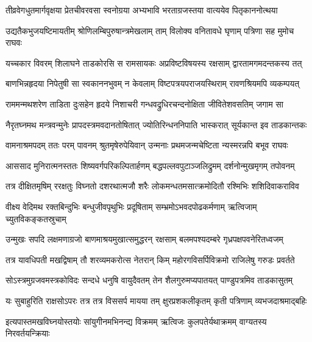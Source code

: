 \fourlineindentedshloka
{तीव्रवेगधुतमार्गवृक्षया}
{प्रेतचीवरवसा स्वनोग्रया}
{अभ्यभावि भरताग्रजस्तया}
{वात्ययेव पितृकाननोत्थया} %

\fourlineindentedshloka
{उद्यतैकभुजयष्टिमायतीम्}
{श्रोणिलम्बिपुरुषान्त्रमेखलाम्}
{ताम् विलोक्य वनितावधे घृणाम्}
{पत्रिणा सह मुमोच राघवः} %

\fourlineindentedshloka
{यच्चकार विवरम् शिलाघने}
{ताडकोरसि स रामसायकः}
{अप्रविष्टविषयस्य रक्षसाम्}
{द्वारतामगमदन्तकस्य तत्} %

\fourlineindentedshloka
{बाणभिन्नहृदया निपेतुषी}
{सा स्वकाननभुवम् न केवलाम्}
{विष्टपत्रयपराजयस्थिराम्}
{रावणश्रियमपि व्यकम्पयत्} %

\fourlineindentedshloka
{राममन्मथशरेण ताडिता}
{दुःसहेन हृदये निशाचरी}
{गन्धवद्रुधिरचन्दनोक्षिता}
{जीवितेशवसतिम् जगाम सा} %

\fourlineindentedshloka
{नैरृतघ्नमथ मन्त्रवन्मुनेः}
{प्रापदस्त्रमवदानतोषितात्}
{ज्योतिरिन्धननिपाति भास्करात्}
{सूर्यकान्त इव ताडकान्तकः} %

\fourlineindentedshloka
{वामनाश्रमपदम् ततः परम्}
{पावनम् श्रुतमृषेरुपेयिवान्}
{उन्मनाः प्रथमजन्मचेष्टिता}
{न्यस्मरन्नपि बभूव राघवः} %

\fourlineindentedshloka
{आससाद मुनिरात्मनस्ततः}
{शिष्यवर्गपरिकल्पितार्हणम्}
{बद्धपल्लवपुटाञ्जलिद्रुमम्}
{दर्शनोन्मुखमृगम् तपोवनम्} %

\fourlineindentedshloka
{तत्र दीक्षितमृषिम् ररक्षतुः}
{विघ्नतो दशरथात्मजौ शरैः}
{लोकमन्धतमसात्क्रमोदितौ}
{रश्मिभिः शशिदिवाकराविव} %

\fourlineindentedshloka
{वीक्ष्य वेदिमथ रक्तबिन्दुभिः}
{बन्धुजीवपृथुभिः प्रदूषिताम्}
{सम्भ्रमोऽभवदपोढकर्मणाम्}
{ऋत्विजाम् च्युतविकङ्कतस्रुचाम्} %

\fourlineindentedshloka
{उन्मुखः सपदि लक्षमणाग्रजो}
{बाणमाश्रयमुखात्समुद्धरन्}
{रक्षसाम् बलमपश्यदम्बरे}
{गृध्रपक्षपवनेरितध्वजम्} %

\fourlineindentedshloka
{तत्र यावधिपती मखद्विषाम्}
{तौ शरव्यमकरोत्स नेतरान्}
{किम् महोरगविसर्पिविक्रमो}
{राजिलेषु गरुडः प्रवर्तते} %

\fourlineindentedshloka
{सोऽस्त्रमुग्रजवमस्त्रकोविदः}
{सन्दधे धनुषि वायुदैवतम्}
{तेन शैलगुरुमप्यपातयत्}
{पाण्डुपत्रमिव ताडकासुतम्} %

\fourlineindentedshloka
{यः सुबाहुरिति राक्षसोऽपरः}
{तत्र तत्र विससर्प मायया}
{तम् क्षुरप्रशकलीकृतम् कृती}
{पत्रिणाम् व्यभजदाश्रमाद्बहिः} %

\fourlineindentedshloka
{इत्यपास्तमखविघ्नयोस्तयोः}
{सांयुगीनमभिनन्द्य विक्रमम्}
{ऋत्विजः कुलपतेर्यथाक्रमम्}
{वाग्यतस्य निरवर्तयन्क्रियाः} %

